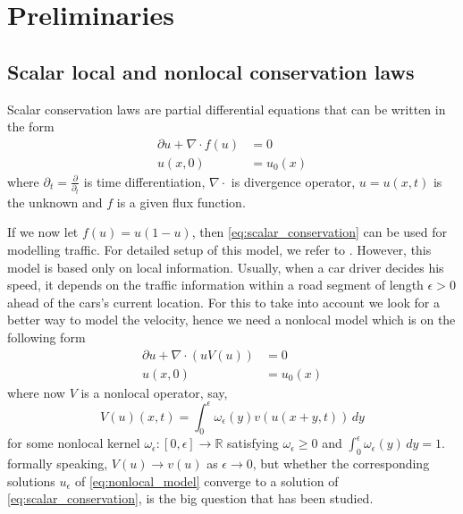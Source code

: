 \section{Preliminaries}
\subsection{Scalar local and nonlocal conservation laws}

Scalar conservation laws are partial differential equations that can be written in the form
\begin{equation}\label{eq:scalar_conservation}
    \begin{split}
        \partial u + \nabla \cdot f(u) & = 0        \\
        u(x,0)                         & = u_{0}(x)
    \end{split}
\end{equation}
where $\partial_{t} = \frac{\partial}{\partial_{t}}$ is time differentiation, $\nabla \cdot$
is divergence operator, $ u = u(x,t)$ is the unknown and $f$ is a given flux function.

If we now let $f(u) = u(1-u)$, then \cref{eq:scalar_conservation} can be used for modelling traffic. For detailed setup of this model, we refer to
\cite{Ulrik2015}.
However, this model is based only on local information. Usually, when a car driver decides his speed, it depends on the traffic information within a road segment
of length $\epsilon > 0$ ahead of the cars's current location. For this to take into account we look for a better way to model
the velocity, hence we need a nonlocal model which is on the following form
\begin{equation}\label{eq:nonlocal_model}
    \begin{split}
        \partial u + \nabla \cdot (uV(u)) & = 0        \\
        u(x,0)                            & = u_{0}(x)
    \end{split}
\end{equation}
where now $V$ is a nonlocal operator, say,
\begin{equation}
    V(u)(x,t) = \int_{0}^{\epsilon} \omega_{\epsilon}(y) v(u(x+y,t)) \, dy
\end{equation}
for some
nonlocal kernel $\omega_{\epsilon}: [0,\epsilon] \rightarrow \mathbb{R}$ satisfying $\omega_{\epsilon} \geq 0$ and $\int_{0}^{\epsilon} \omega_{\epsilon}(y)  \, dy = 1$.
formally speaking, $V(u) \rightarrow v(u)$ as $\epsilon \rightarrow 0$, but whether the corresponding solutions
$u_{\epsilon}$ of \eqref{eq:nonlocal_model} converge to a solution of \eqref{eq:scalar_conservation}, is the big question that has been studied.

